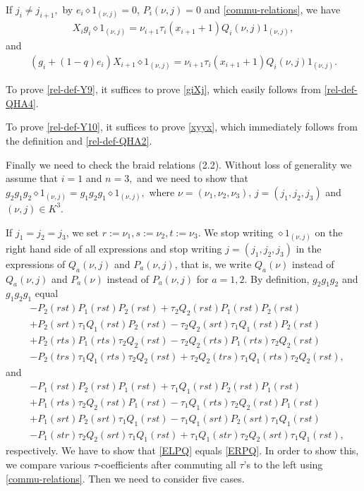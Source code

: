 \documentclass[11pt, reqno]{amsart} \textwidth=14.9cm \oddsidemargin=1cm \evensidemargin=1cm
\theoremstyle{definition}
\numberwithin{equation}{section}
\begin{document}
If $j_{i}\neq j_{i+1},$ by $e_{i}\diamond 1_{(\nu, j)}=0$, $P_{i}(\nu, j)=0$ and \eqref{commu-relations}, we have
\begin{align*}
X_{i}g_{i}\diamond 1_{(\nu, j)}=\nu_{i+1}\tau_{i}(x_{i+1}+1)Q_{i}(\nu, j)1_{(\nu, j)},
\end{align*}
and
\begin{align*}
(g_{i}+(1-q)e_{i})X_{i+1}\diamond 1_{(\nu, j)}=\nu_{i+1}\tau_{i}(x_{i+1}+1)Q_{i}(\nu, j)1_{(\nu, j)}.
\end{align*}

To prove \eqref{rel-def-Y9}, it suffices to prove \eqref{giXj}, which easily follows from \eqref{rel-def-QHA4}.

To prove \eqref{rel-def-Y10}, it suffices to prove \eqref{xyyx}, which immediately follows from the definition and \eqref{rel-def-QHA2}.

Finally we need to check the braid relations (2.2). Without loss of generality we assume that $i=1$ and $n=3,$ and we need to show that $g_{2}g_{1}g_{2}\diamond 1_{(\nu, j)}=g_{1}g_{2}g_{1}\diamond 1_{(\nu, j)},$ where $\nu=(\nu_1, \nu_2, \nu_3)$, $j=(j_1, j_2, j_3)$ and $(\nu, j)\in K^{3}.$

If $j_1=j_2=j_3$, we set $r:=\nu_1, s:=\nu_2, t:=\nu_3.$ We stop writing $\diamond 1_{(\nu, j)}$ on the right hand side of all expressions and stop writing $j=(j_1, j_2, j_3)$ in the expressions of $Q_{a}(\nu, j)$ and $P_{a}(\nu, j)$, that is, we write $Q_{a}(\nu)$ instead of $Q_{a}(\nu, j)$ and $P_{a}(\nu)$ instead of $P_{a}(\nu, j)$ for $a=1,2.$ By definition, $g_{2}g_{1}g_{2}$ and $g_{1}g_{2}g_{1}$ equal
\begin{equation}\label{ELPQ}
\begin{split}
&-P_2(rst)P_1(rst)P_2(rst)+ \tau_2Q_2(rst)P_1(rst)P_2(rst)
\\
&+ P_2(srt)\tau_1Q_1(rst)P_2(rst)
-\tau_2Q_2(srt)\tau_1Q_1(rst)P_2(rst)
\\
&+ P_2(rts)P_1(rts)\tau_2Q_2(rst)
- \tau_2Q_2(rts)P_1(rts)\tau_2Q_2(rst)
\\
&- P_2(trs)\tau_1Q_1(rts)\tau_2Q_2(rst)
+ \tau_2Q_2(trs)\tau_1Q_1(rts)\tau_2Q_2(rst),
\end{split}
\end{equation}
and
\begin{equation}\label{ERPQ}
\begin{split}
&-P_1(rst)P_2(rst)P_1(rst)+ \tau_1Q_1(rst)P_2(rst)P_1(rst)
\\&+ P_1(rts)\tau_2Q_2(rst)P_1(rst)
-\tau_1Q_1(rts)\tau_2Q_2(rst)P_1(rst)
\\&+ P_1(srt)P_2(srt)\tau_1Q_1(rst)
- \tau_1Q_1(srt)P_2(srt)\tau_1Q_1(rst)
\\& - P_1(str)\tau_2Q_2(srt)\tau_1Q_1(rst)
+ \tau_1Q_1(str)\tau_2Q_2(srt)\tau_1Q_1(rst),
\end{split}
\end{equation}
respectively. We have to show that \eqref{ELPQ} equals \eqref{ERPQ}. In order to show this, we compare various $\tau$-coefficients after commuting all $\tau$'s to the left using \eqref{commu-relations}. Then we need to consider five cases.
\end{document}
